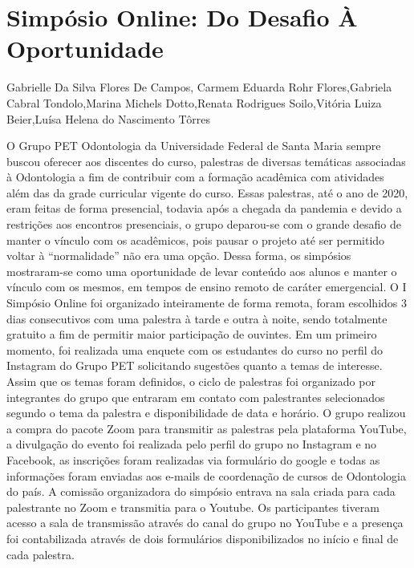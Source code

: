 
\section*{Simpósio Online: Do Desafio À Oportunidade}

Gabrielle Da Silva Flores De Campos, Carmem Eduarda Rohr Flores,Gabriela Cabral Tondolo,Marina Michels Dotto,Renata Rodrigues Soilo,Vitória Luiza Beier,Luísa Helena do Nascimento Tôrres

O Grupo PET Odontologia da Universidade Federal de Santa Maria sempre buscou oferecer aos
discentes do curso, palestras de diversas temáticas associadas à Odontologia a fim de contribuir
com a formação acadêmica com atividades além das da grade curricular vigente do curso. Essas
palestras, até o ano de 2020, eram feitas de forma presencial, todavia após a chegada da
pandemia e devido a restrições aos encontros presenciais, o grupo deparou-se com o grande
desafio de manter o vínculo com os acadêmicos, pois pausar o projeto até ser permitido voltar à
“normalidade” não era uma opção. Dessa forma, os simpósios mostraram-se como uma
oportunidade de levar conteúdo aos alunos e manter o vínculo com os mesmos, em tempos de
ensino remoto de caráter emergencial. O I Simpósio Online foi organizado inteiramente de forma
remota, foram escolhidos 3 dias consecutivos com uma palestra à tarde e outra à noite, sendo
totalmente gratuito a fim de permitir maior participação de ouvintes. Em um primeiro momento,
foi realizada uma enquete com os estudantes do curso no perfil do Instagram do Grupo PET
solicitando sugestões quanto a temas de interesse. Assim que os temas foram definidos, o ciclo
de palestras foi organizado por integrantes do grupo que entraram em contato com palestrantes
selecionados segundo o tema da palestra e disponibilidade de data e horário. O grupo realizou a
compra do pacote Zoom para transmitir as palestras pela plataforma YouTube, a divulgação do
evento foi realizada pelo perfil do grupo no Instagram e no Facebook, as inscrições foram
realizadas via formulário do google e todas as informações foram enviadas aos e-mails de
coordenação de cursos de Odontologia do país. A comissão organizadora do simpósio entrava na
sala criada para cada palestrante no Zoom e transmitia para o Youtube. Os participantes tiveram
acesso a sala de transmissão através do canal do grupo no YouTube e a presença foi
contabilizada através de dois formulários disponibilizados no início e final de cada palestra.
